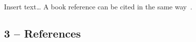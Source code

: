 \documentclass[a4paper,11pt]{article}
\begin{document}
Insert text\ldots{} A book reference can be cited in the same way~\cite{garcia2022example}.

\subsection*{3 -- References}
\vspace{-1cm}

\renewcommand{\refname}{}

\end{document}
